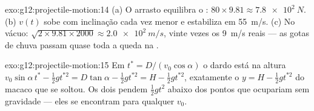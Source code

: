 \begin{solution}{exo:g12:projectile-motion:14}
(a) O arrasto equilibra o : $80 \times 9.81 \approx \qty{7.8e2}{N}$.
(b) $v(t)$ sobe com inclinação cada vez menor e estabiliza em
\qty{55}{m/s}. (c) No vácuo:
$\sqrt{2 \times 9.81 \times 2000} \approx \qty{2.0e2}{m/s}$, vinte vezes
os \qty{9}{m/s} reais --- as gotas de chuva passam quase toda a queda na
.
\end{solution}

\begin{solution}{exo:g12:projectile-motion:15}
Em $t^* = D/(v_0\cos\alpha)$ o dardo está na altura
$v_0\sin\alpha\, t^* - \tfrac12 g t^{*2} = D\tan\alpha - \tfrac12 g
t^{*2} = H - \tfrac12 g t^{*2}$, exatamente o
$y = H - \tfrac12 g t^{*2}$ do macaco que se soltou. Os dois pendem
$\tfrac12 gt^2$ abaixo dos pontos que ocupariam sem gravidade --- eles se
encontram para qualquer $v_0$.
\end{solution}

